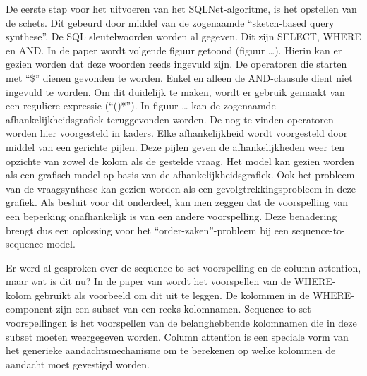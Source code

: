 De eerste stap voor het uitvoeren van het SQLNet-algoritme, is het opstellen van de schets. Dit gebeurd door middel van de zogenaamde “sketch-based query synthese”. De SQL sleutelwoorden worden al gegeven. Dit zijn SELECT, WHERE en AND. In de paper wordt volgende figuur getoond (figuur …). Hierin kan er gezien worden dat deze woorden reeds ingevuld zijn. De operatoren die starten met “\$” dienen gevonden te worden. Enkel en alleen de AND-clausule dient niet ingevuld te worden. Om dit duidelijk te maken, wordt er gebruik gemaakt van een reguliere expressie (“()*”). In figuur … kan de zogenaamde afhankelijkheidsgrafiek teruggevonden worden. De nog te vinden operatoren worden hier voorgesteld in kaders. Elke afhankelijkheid wordt voorgesteld door middel van een gerichte pijlen. Deze pijlen geven de afhankelijkheden weer ten opzichte van zowel de kolom als de gestelde vraag. Het model kan gezien worden als een grafisch model op basis van de afhankelijkheidsgrafiek. Ook het probleem van de vraagsynthese kan gezien worden als een gevolgtrekkingsprobleem in deze grafiek. Als besluit voor dit onderdeel, kan men zeggen dat de voorspelling van een beperking onafhankelijk is van een andere voorspelling. Deze benadering brengt dus een oplossing voor het “order-zaken”-probleem bij een sequence-to-sequence model.

Er werd al gesproken over de sequence-to-set voorspelling en de column attention, maar wat is dit nu? In de paper van \textcite{sqlnetPaper} wordt het voorspellen van de WHERE-kolom gebruikt als voorbeeld om dit uit te leggen. De kolommen in de WHERE-component zijn een subset van een reeks kolomnamen. Sequence-to-set voorspellingen is het voorspellen van de belanghebbende kolomnamen die in deze subset moeten weergegeven worden. Column attention is een speciale vorm van het generieke aandachtsmechanisme om te berekenen op welke kolommen de aandacht moet gevestigd worden. 

